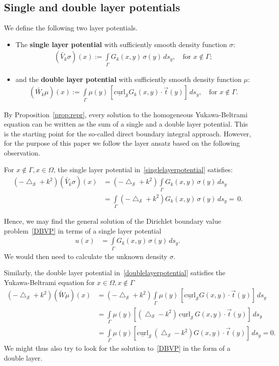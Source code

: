 \documentclass[final]{siamltex}
\newcommand{\lap}{\bigtriangleup}
\renewcommand{\S} {\mathcal{S}}
\begin{document}
\subsection{Single and double layer potentials}
We define the following two layer potentials.
\begin{itemize}
\item The {\bf single layer potential} with sufficiently smooth density function $\sigma$:
  \begin{align}\label{singlelayerpotential}
    (\widetilde{V_k}\sigma)(x):=\int\limits_{\Gamma}
    G_k(x,y)\,\sigma(y)\,ds_y,\quad\mbox{for $x \notin \Gamma$};
  \end{align}
\item and the {\bf double layer potential} with sufficiently smooth density function $\mu$:
  \begin{align}\label{doublelayerpotential}
    (\widetilde{W_k}\mu )(x):=\int\limits_{\Gamma}
    \mu(y)\,[\underline{\mbox{curl}}_{\S} G_k(x,y)\cdot \vec{t}(y)]\,
    ds_y, \quad\mbox{for $x\notin\Gamma$}.
  \end{align}
\end{itemize}
By Proposition~\ref{prop:repr}, every solution to the homogeneous
Yukawa-Beltrami equation can be written as the sum of a single and a
double layer potential.  This  is the starting point for the so-called
direct boundary integral approach. However, for the purpose of this
paper we follow the layer ansatz based on the following observation.

For $x\notin\Gamma, x\in \Omega$, the single layer potential
in~\eqref{singlelayerpotential} satisfies:
\begin{align*}
  (-\lap_{\S} + k^{2}) (\widetilde{V_k}\sigma)(x)& =
  (-\lap_{\S} + k^2) \int\limits_\Gamma G_k(x,y)\, \sigma(y)\,ds_{y} \\
  & = \int\limits_\Gamma (-\lap_{\S}+k^2) G_k(x,y)\, 
    \sigma(y)\,ds_{y}= \, 0.
\end{align*}

Hence, we may find the general solution of the Dirichlet boundary value
problem~\eqref{DBVP} in terms of a single layer potential
\begin{align*}
  u(x) & =  \int\limits_\Gamma G_k(x,y) \,\sigma(y) \,ds_{y}. 
\end{align*}
We would then need to calculate the unknown density $\sigma$.
 
Similarly, the double layer potential in~\eqref{doublelayerpotential}
satisfies the Yukawa-Beltrami equation for $x\in \Omega, x\notin\Gamma$
\begin{align*}
  (-\lap_{\S} + k^2)(\widetilde{W}\mu)(x) & = (-\lap_{\S}+k^2)
  \int\limits_\Gamma \mu(y)\, [\underline{\mbox{curl}}_{\S}
  G(x,y)\cdot\vec{t}(y)]\,ds_{y} \\
  &=\int\limits_\Gamma \mu(y)
  [(\lap_{\S}-k^2)\,\underline{\mbox{curl}}_{\S}\,
  G(x,y)\cdot\vec{t}(y)]\,ds_{y} \\ 
  &=\int\limits_\Gamma \mu(y) [\underline{\mbox{curl}}_{\S} \,
  (\lap_{\S} -k^2)G(x,y)\cdot\vec{t}(y)]\,ds_{y} = 0.
\end{align*}
We might thus also try to look for the solution to~\eqref{DBVP} in the
form of a double layer.
\end{document}
